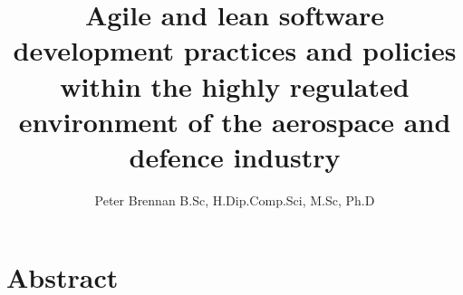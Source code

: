 \documentclass[11pt,twocolumn]{article}
\title{Agile and lean software development practices and policies within the highly regulated environment of the aerospace and defence industry}
\author{Peter Brennan B.Sc, H.Dip.Comp.Sci, M.Sc, Ph.D}
\begin{document}
\maketitle
\section*{\textbf{Abstract}} 
\end{document}
